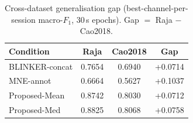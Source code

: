 \begin{table}[ht]
  \centering
  \caption{Cross-dataset generalisation gap (best-channel-per-session macro-$F_1$, 30\,s epochs). Gap $=$ Raja $-$ Cao2018.}
  \label{tab:cross_dataset_gap}
  \begin{tabular}{lccc}
    \toprule
    Condition & Raja & Cao2018 & Gap \\
    \midrule
    BLINKER-concat & 0.7654 & 0.6940 & +0.0714 \\
    MNE-annot & 0.6664 & 0.5627 & +0.1037 \\
    Proposed-Mean & 0.8742 & 0.8030 & +0.0712 \\
    Proposed-Med & 0.8825 & 0.8068 & +0.0758 \\
    \bottomrule
  \end{tabular}
\end{table}
